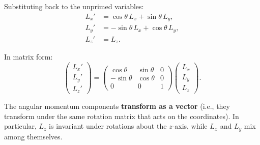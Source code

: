\documentclass[12pt]{article}
\begin{document}
Substituting back to the unprimed variables:
\begin{align*}
L_x' &= \cos\theta\, L_x + \sin\theta\, L_y, \\
L_y' &= -\sin\theta\, L_x + \cos\theta\, L_y, \\
L_z' &= L_z.
\end{align*}

In matrix form:
\[
\begin{pmatrix} L_x' \\ L_y' \\ L_z' \end{pmatrix} =
\begin{pmatrix} \cos\theta & \sin\theta & 0 \\ -\sin\theta & \cos\theta & 0 \\ 0 & 0 & 1 \end{pmatrix}
\begin{pmatrix} L_x \\ L_y \\ L_z \end{pmatrix}.
\]

The angular momentum components \textbf{transform as a vector} (i.e., they transform under the same rotation matrix that acts on the coordinates). In particular, $L_z$ is invariant under rotations about the $z$-axis, while $L_x$ and $L_y$ mix among themselves.
\end{document}

